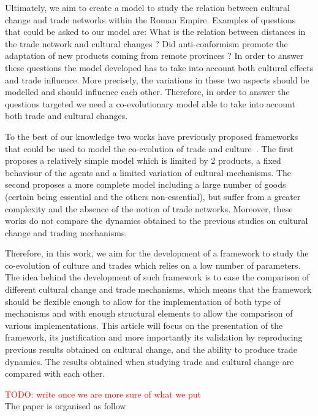 \documentclass{wscpaperproc}
\newcommand{\memo}[2]{\textcolor{#1}{#2}}
\newcommand{\todo}[1]{\memo{red}{TODO: #1\\}}
\begin{document}
Ultimately, we aim to create a model to study the relation between cultural change and trade networks within the Roman Empire. Examples of questions that could be asked to our model are: What is the relation between distances in the trade network and cultural changes ? Did anti-conformism promote the adaptation of new products coming from remote provinces ? In order to answer these questions the model developed has to take into account both cultural effects and trade influence. More precisely, the variations in these two aspects should be modelled and should influence each other.  Therefore, in order to answer the questions targeted we need a co-evolutionary model able to take into account both trade and cultural changes. 

To the best of our knowledge two works have previously proposed frameworks that could be used to model the co-evolution of trade and culture~\cite{bentley_specialisation_2005,macmillan_agent-based_2008}. The first proposes a relatively simple model which is limited by 2 products, a fixed behaviour of the agents and a limited variation of cultural mechanisms. The second proposes a more complete model including a large number of goods (certain being essential and the others non-essential), but suffer from a greater complexity and the absence of the notion of trade networks. Moreover, these works do not compare the dynamics obtained to the previous studies on cultural change and trading mechanisms.

Therefore, in this work, we aim for the development of a framework to study the co-evolution of culture and trades which relies on a low number of parameters. The idea behind the development of such framework is to ease the comparison of different cultural change and trade mechanisms, which means that the framework should be flexible enough to allow for the implementation of both type of mechanisms and with enough structural elements to allow the comparison of various implementations. This article will focus on the presentation of the framework, its justification and more importantly its validation by reproducing previous results obtained on cultural change, and the ability to produce trade dynamics. The results obtained when studying trade and cultural change are compared with each other.

\todo{write once we are more sure of what we put}
The paper is organised as follow
\end{document}
